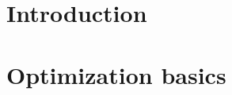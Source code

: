 \documentclass[12pt, leqno]{article} %
\begin{document}

\section{Introduction}

\section{Optimization basics}

\end{document}
